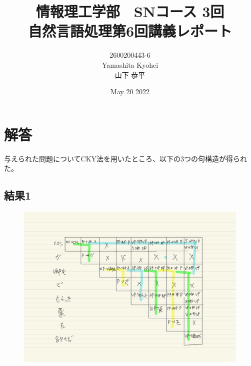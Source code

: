 \documentclass[dvipdfmx,autodetect-engine,titlepage]{jsarticle}
\title{情報理工学部　SNコース 3回\\
自然言語処理第6回講義レポート\\}
\author{2600200443-6\\Yamashita Kyohei\\山下 恭平}
\date{May 20 2022}
\begin{document}
\maketitle

\section{解答}
与えられた問題についてCKY法を用いたところ、以下の3つの句構造が得られた。

\subsection{結果1}

\begin{figure}[h]
  \centering
  \begin{minipage}[b]{0.45\linewidth}
  \begin{center}
    \includegraphics[keepaspectratio,scale=0.08]{pic1.jpg}
    \end{center}
    \caption{}
  \end{minipage}
  \begin{minipage}[b]{0.45\linewidth}
  \begin{center}

\end{center}
\end{minipage}
\end{figure}
\end{document}
